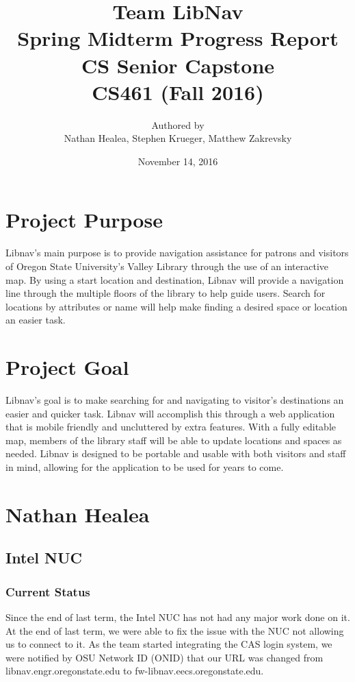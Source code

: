 \documentclass[letterpaper,10pt,serif,titlepage, onecolumn, compsoc]{IEEEtran}
\title{Team LibNav \\ Spring Midterm Progress Report \\ CS Senior Capstone \\ \vspace{2mm}\small CS461 (Fall 2016)}
\author{Authored by \\ Nathan Healea, Stephen Krueger, Matthew Zakrevsky}
\date{November 14, 2016}
\begin{document}
\maketitle



\section*{Project Purpose}
Libnav's main purpose is to provide navigation assistance for patrons and visitors of Oregon State University’s Valley Library through the use of an interactive map. By using a start location and destination, Libnav will provide a navigation line through the multiple floors of the library to help guide users. Search for locations by attributes or name will help make finding a desired space or location an easier task. 

\section{Project Goal}
Libnav’s goal is to make searching for and navigating to visitor’s destinations an easier and quicker task. Libnav will accomplish this through a web application that is mobile friendly and uncluttered by extra features. With a fully editable map, members of the library staff will be able to update locations and spaces as needed.  Libnav is designed to be portable and usable with both visitors and staff in mind, allowing for the application to be used for years to come. 


\section{Nathan Healea}

\subsection{Intel NUC}
\subsubsection{Current Status}
Since the end of last term, the Intel NUC has not had any major work done on it. At the end of last term, we were able to fix the issue with the NUC not allowing us to connect to it. As the team started integrating the CAS login system, we were notified by OSU Network ID (ONID) that our URL was changed from libnav.engr.oregonstate.edu to fw-libnav.eecs.oregonstate.edu. 
\end{document}
